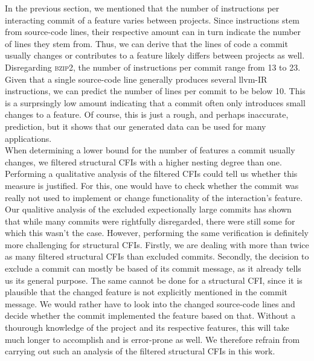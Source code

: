 In the previous section, we mentioned that the number of instructions per interacting commit of a feature varies between projects.
Since instructions stem from source-code lines, their respective amount can in turn indicate the number of lines they stem from.
Thus, we can derive that the lines of code a commit usually changes or contributes to a feature likely differs between projects as well.
Disregarding \textsc{bzip2}, the number of instructions per commit range from 13 to 23.
Given that a single source-code line generally produces several llvm-IR instructions, we can predict the number of lines per commit to be below 10.
This is a surprsingly low amount indicating that a commit often only introduces small changes to a feature.
Of course, this is just a rough, and perhaps inaccurate, prediction, but it shows that our generated data can be used for many applications. \\
When determining a lower bound for the number of features a commit usually changes, we filtered structural CFIs with a higher nesting degree than one.
Performing a qualitative analysis of the filtered CFIs could tell us whether this measure is justified.
For this, one would have to check whether the commit was really not used to implement or change functionality of the interaction's feature.
Our qualitive analysis of the excluded expectionally large commits has shown that while many commits were rightfully disregarded, there were still some for which this wasn't the case.
However, performing the same verification is definitely more challenging for structural CFIs.
Firstly, we are dealing with more than twice as many filtered structural CFIs than excluded commits.
Secondly, the decision to exclude a commit can mostly be based of its commit message, as it already tells us its general purpose.
The same cannot be done for a structural CFI, since it is plausible that the changed feature is not explicitly mentioned in the commit message.
We would rather have to look into the changed source-code lines and decide whether the commit implemented the feature based on that.
Without a thourough knowledge of the project and its respective features, this will take much longer to accomplish and is error-prone as well.
We therefore refrain from carrying out such an analysis of the filtered structural CFIs in this work. \\

